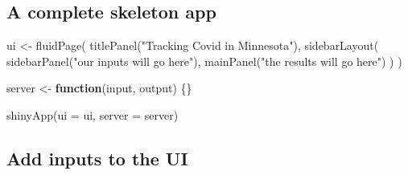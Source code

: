 \documentclass[
]{book}
\newenvironment{Shaded}{\begin{snugshade}}{\end{snugshade}}
\newcommand{\AttributeTok}[1]{\textcolor[rgb]{0.77,0.63,0.00}{#1}}
\newcommand{\ControlFlowTok}[1]{\textcolor[rgb]{0.13,0.29,0.53}{\textbf{#1}}}
\newcommand{\FunctionTok}[1]{\textcolor[rgb]{0.00,0.00,0.00}{#1}}
\newcommand{\NormalTok}[1]{#1}
\newcommand{\OtherTok}[1]{\textcolor[rgb]{0.56,0.35,0.01}{#1}}
\newcommand{\StringTok}[1]{\textcolor[rgb]{0.31,0.60,0.02}{#1}}
\begin{document}
\hypertarget{a-complete-skeleton-app}{%
\subsection{A complete skeleton app}\label{a-complete-skeleton-app}}

\begin{Shaded}
\begin{Highlighting}[]
\NormalTok{ui }\OtherTok{\textless{}{-}} \FunctionTok{fluidPage}\NormalTok{(}
  \FunctionTok{titlePanel}\NormalTok{(}\StringTok{"Tracking Covid in Minnesota"}\NormalTok{),}
  \FunctionTok{sidebarLayout}\NormalTok{(}
    \FunctionTok{sidebarPanel}\NormalTok{(}\StringTok{"our inputs will go here"}\NormalTok{),}
    \FunctionTok{mainPanel}\NormalTok{(}\StringTok{"the results will go here"}\NormalTok{)}
\NormalTok{  )}
\NormalTok{)}

\NormalTok{server }\OtherTok{\textless{}{-}} \ControlFlowTok{function}\NormalTok{(input, output) \{\}}

\FunctionTok{shinyApp}\NormalTok{(}\AttributeTok{ui =}\NormalTok{ ui, }\AttributeTok{server =}\NormalTok{ server)}
\end{Highlighting}
\end{Shaded}

\hypertarget{add-inputs-to-the-ui}{%
\subsection{Add inputs to the UI}\label{add-inputs-to-the-ui}}
\end{document}
